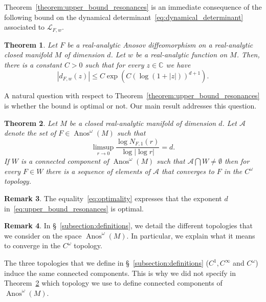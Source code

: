 \documentclass[10pt]{amsart}
\newtheorem{theo}{Theorem}[section]
\theoremstyle{definition}\newtheorem{defi}[theo]{Definition}\newtheorem{rema}[theo]{Remark}\newtheorem{exam}[theo]{Example}\newtheorem{exem}[theo]{Example}\newtheorem{nota}[theo]{Notation}
\DeclareMathOperator{\Anos}{Anos}
\newcommand{\p}[1]{\left(#1\right)}
\newcommand{\va}[1]{\left|#1\right|}
\newcommand{\clL}{\mathcal{L}}
\newcommand{\clA}{\mathcal{A}}
\newcommand{\bbC}{\mathbb{C}}
\begin{document}
Theorem~\ref{theorem:upper_bound_resonances} is an immediate consequence of the following bound on the dynamical determinant~\eqref{eq:dynamical_determinant} associated to $\clL_{F,w}$.

\begin{theo}\label{thm:upper_bound_determinant}
Let $F$ be a real-analytic Anosov diffeomorphism on a real-analytic closed manifold $M$ of dimension $d$. Let $w$ be a real-analytic function on $M$. Then, there is a constant $C > 0$ such that for every $z \in \bbC$ we have
\begin{equation*}
\va{d_{F,w}(z)} \leq C \exp\p{C\p{\log(1 + \va{z})}^{d+1}}.
\end{equation*}
\end{theo}

A natural question with respect to Theorem~\ref{theorem:upper_bound_resonances} is whether the bound is optimal or not. Our main result addresses this question.


\begin{theo}\label{theorem:optimal_dense}
Let $M$ be a closed real-analytic manifold of dimension $d$. Let $\clA$ denote the set of $F \in \Anos^\omega(M)$ such that
\begin{equation}\label{eq:optimality}
\limsup_{r \to 0} \frac{\log N_{F,1}(r)}{\log \va{\log r}} = d.
\end{equation}
If $W$ is a connected component of $\Anos^\omega(M)$ such that $\clA\bigcap W \neq \emptyset$ then for every $F \in W$ there is a sequence of elements of $\clA$ that converges to $F$ in the $C^\omega$ topology.
\end{theo}


\begin{rema}
The equality~\eqref{eq:optimality} expresses that the exponent $d$ in~\eqref{eq:upper_bound_resonances} is optimal.
\end{rema}

\begin{rema}
In \S~\ref{subsection:definitions}, we detail the different topologies that we consider on the space $\Anos^\omega(M)$. In particular, we explain what it means to converge in the $C^\omega$ topology.

The three topologies that we define in \S~\ref{subsection:definitions} ($C^1,C^\infty$ and $C^\omega$) induce the same connected components. This is why we did not specify in Theorem~\ref{theorem:optimal_dense} which topology we use to define connected components of $\Anos^\omega(M)$.
\end{rema}
\end{document}
